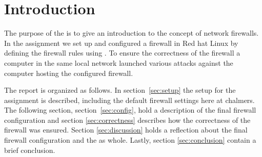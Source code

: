 \section{Introduction} 
\label{sec:intro}

The purpose of the \lab is to give an introduction to the concept of network firewalls. In the assignment we set up and configured a firewall in Red hat Linux by defining the firewall rules using . To ensure the correctness of the firewall a computer in the same local network launched various attacks against the computer hosting the configured firewall. 

The report is organized as follows. In section~\ref{sec:setup} the setup for the assignment is described, including the default firewall settings here at chalmers. The following section, section~\ref{sec:config}, hold a description of the final firewall configuration and section \ref{sec:correctness} describes how the correctness of the firewall was ensured. Section \ref{sec:discussion} holds a reflection about the final firewall configuration and the \lab as whole. Lastly, section \ref{sec:conclusion} contain a brief conclusion.
